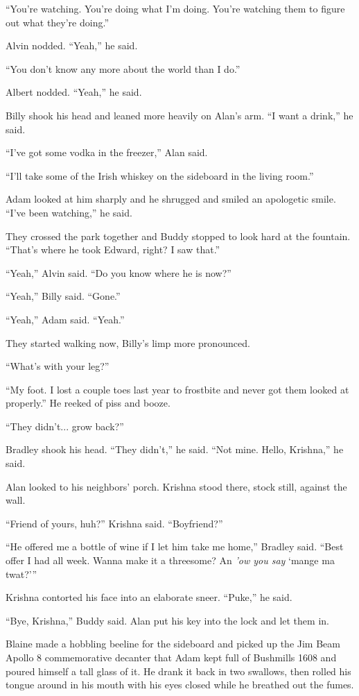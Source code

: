 ``You're watching.  You're doing what I'm doing.  You're watching them
to figure out what they're doing.''

Alvin nodded.  ``Yeah,'' he said.

``You don't know any more about the world than I do.''

Albert nodded.  ``Yeah,'' he said.

Billy shook his head and leaned more heavily on Alan's arm.  ``I want
a drink,'' he said.

``I've got some vodka in the freezer,'' Alan said.

``I'll take some of the Irish whiskey on the sideboard in the living
room.''

Adam looked at him sharply and he shrugged and smiled an apologetic
smile.  ``I've been watching,'' he said.

They crossed the park together and Buddy stopped to look hard at the
fountain.  ``That's where he took Edward, right?  I saw that.''

``Yeah,'' Alvin said.  ``Do you know where he is now?''

``Yeah,'' Billy said.  ``Gone.''

``Yeah,'' Adam said.  ``Yeah.''

They started walking now, Billy's limp more pronounced.

``What's with your leg?''

``My foot.  I lost a couple toes last year to frostbite and never got
them looked at properly.'' He reeked of piss and booze.

``They didn't...  grow back?''

Bradley shook his head.  ``They didn't,'' he said.  ``Not mine. 
Hello, Krishna,'' he said.

Alan looked to his neighbors' porch.  Krishna stood there, stock
still, against the wall.

``Friend of yours, huh?'' Krishna said.  ``Boyfriend?''

``He offered me a bottle of wine if I let him take me home,'' Bradley
said.  ``Best offer I had all week.  Wanna make it a threesome?  An
\textit{'ow you say} `mange ma twat?'''

Krishna contorted his face into an elaborate sneer.  ``Puke,'' he
said.

``Bye, Krishna,'' Buddy said.  Alan put his key into the lock and let
them in.

Blaine made a hobbling beeline for the sideboard and picked up the Jim
Beam Apollo 8 commemorative decanter that Adam kept full of Bushmills
1608 and poured himself a tall glass of it.  He drank it back in two
swallows, then rolled his tongue around in his mouth with his eyes
closed while he breathed out the fumes.

